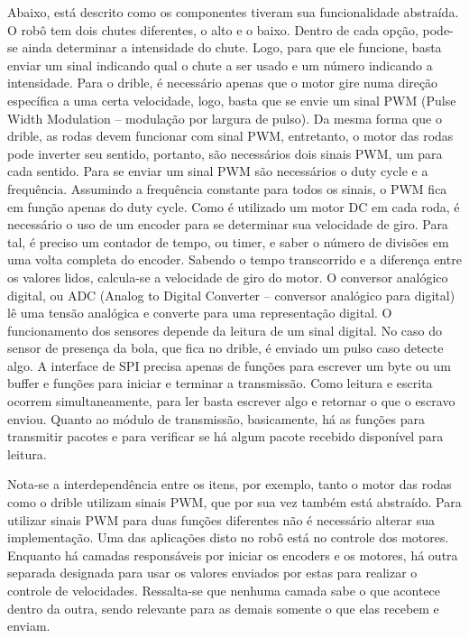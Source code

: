 Abaixo, está descrito como os componentes tiveram sua funcionalidade abstraída.
O robô tem dois chutes diferentes, o alto e o baixo. Dentro de cada opção, pode-se ainda determinar a intensidade do chute. Logo, para que ele funcione, basta enviar um sinal indicando qual o chute a ser usado e um número indicando a intensidade.
Para o drible, é necessário apenas que o motor gire numa direção específica a uma certa velocidade, logo, basta que se envie um sinal PWM (Pulse Width Modulation – modulação por largura de pulso). Da mesma forma que o drible, as rodas devem funcionar com sinal PWM, entretanto, o motor das rodas pode inverter seu sentido, portanto, são necessários dois sinais PWM, um para cada sentido. Para se enviar um sinal PWM são necessários o duty cycle e a frequência. Assumindo a frequência constante para todos os sinais, o PWM fica em função apenas do duty cycle. Como é utilizado um motor DC em cada roda, é necessário o uso de um encoder para se determinar sua velocidade de giro. Para tal, é preciso um contador de tempo, ou timer, e saber o número de divisões em uma volta completa do encoder. Sabendo o tempo transcorrido e a diferença entre os valores lidos, calcula-se a velocidade de giro do motor.
O conversor analógico digital, ou ADC (Analog to Digital Converter – conversor analógico para digital) lê uma tensão analógica e converte para uma representação digital. O funcionamento dos sensores depende da leitura de um sinal digital. No caso do sensor de presença da bola, que fica no drible, é enviado um pulso caso detecte algo.
A interface de SPI precisa apenas de funções para escrever um byte ou um buffer e funções para iniciar e terminar a transmissão. Como leitura e escrita ocorrem simultaneamente, para ler basta escrever algo e retornar o que o escravo enviou.
Quanto ao módulo de transmissão, basicamente, há as funções para transmitir pacotes e para verificar se há algum pacote recebido disponível para leitura.

Nota-se a interdependência entre os itens, por exemplo, tanto o motor das rodas como o drible utilizam sinais PWM, que por sua vez também está abstraído. Para utilizar sinais PWM para duas funções diferentes não é necessário alterar sua implementação.
Uma das aplicações disto no robô está no controle dos motores. Enquanto há camadas responsáveis por iniciar os encoders e os motores, há outra separada designada para usar os valores enviados por estas para realizar o controle de velocidades. Ressalta-se que nenhuma camada sabe o que acontece dentro da outra, sendo relevante para as demais somente o que elas recebem e enviam.


